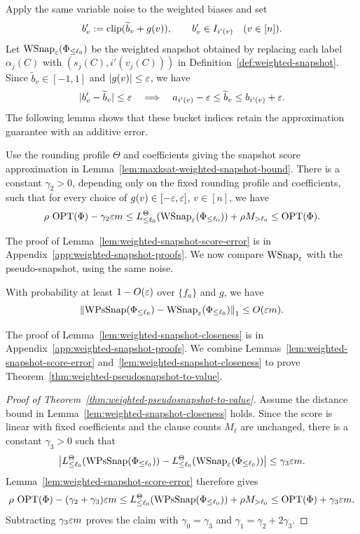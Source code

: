 \medskip
Apply the same variable noise to the weighted biases and set
\[
  b'_v:=\operatorname{clip}(\widetilde b_v+g(v)),\qquad
  b'_v\in I_{i'(v)}\quad(v\in[n]).
\]
Let $\operatorname{WSnap}_{\varepsilon}(\Phi_{\le\ell_0})$ be the weighted snapshot obtained by replacing each label $\alpha_j(C)$ with $(s_j(C),i'(v_j(C)))$ in Definition~\ref{def:weighted-snapshot}.
Since $\widetilde b_v\in[-1,1]$ and $|g(v)|\le\varepsilon$, we have
\[
  |b'_v-\widetilde b_v|\le\varepsilon
  \quad\Longrightarrow\quad
  a_{i'(v)}-\varepsilon\le\widetilde b_v\le b_{i'(v)}+\varepsilon.
\]
The following lemma shows that these bucket indices retain the approximation guarantee with an additive error.
\begin{samepage}
\begin{lemma}
\label{lem:weighted-snapshot-score-error}
Use the rounding profile $\Theta$ and coefficients giving the snapshot score approximation in Lemma~\ref{lem:maxksat-weighted-snapshot-bound}.
There is a constant $\gamma_2>0$, depending only on the fixed rounding profile and coefficients, such that for every choice of $g(v)\in[-\varepsilon,\varepsilon]$, $v\in[n]$, we have
\[
  \rho\,\operatorname{OPT}(\Phi)-\gamma_2\varepsilon m
  \le L_{\le\ell_0}^\Theta(\operatorname{WSnap}_{\varepsilon}(\Phi_{\le\ell_0}))
     +\rho M_{>\ell_0}
  \le\operatorname{OPT}(\Phi).
\]
\end{lemma}
\end{samepage}
The proof of Lemma~\ref{lem:weighted-snapshot-score-error} is in Appendix~\ref{app:weighted-snapshot-proofs}.
We now compare $\operatorname{WSnap}_{\varepsilon}$ with the pseudo-snapshot, using the same noise.
\begin{lemma}
\label{lem:weighted-snapshot-closeness}
With probability at least $1-O(\varepsilon)$ over $\{f_a\}$ and $g$, we have
\[
  \left\lVert \operatorname{WPsSnap}(\Phi_{\le\ell_0})-\operatorname{WSnap}_{\varepsilon}(\Phi_{\le\ell_0}) \right\rVert_1
  \le O(\varepsilon m).
\]
\end{lemma}
The proof of Lemma~\ref{lem:weighted-snapshot-closeness} is in Appendix~\ref{app:weighted-snapshot-proofs}. We combine Lemmas~\ref{lem:weighted-snapshot-score-error} and~\ref{lem:weighted-snapshot-closeness} to prove Theorem~\ref{thm:weighted-pseudosnapshot-to-value}.

\begin{samepage}
\begin{proof}[Proof of Theorem~\ref{thm:weighted-pseudosnapshot-to-value}]
Assume the distance bound in Lemma~\ref{lem:weighted-snapshot-closeness} holds.
Since the score is linear with fixed coefficients and the clause counts $M_\ell$ are unchanged, there is a constant $\gamma_3>0$ such that
\begin{equation}
  \left|L_{\le\ell_0}^\Theta(\operatorname{WPsSnap}(\Phi_{\le\ell_0}))
       -L_{\le\ell_0}^\Theta(\operatorname{WSnap}_{\varepsilon}(\Phi_{\le\ell_0}))\right|
  \le\gamma_3\varepsilon m.
  \label{eq:weighted-pseudosnapshot-score-distance}
\end{equation}
Lemma~\ref{lem:weighted-snapshot-score-error} therefore gives
\[
  \rho\,\operatorname{OPT}(\Phi)-(\gamma_2+\gamma_3)\varepsilon m
  \le L_{\le\ell_0}^\Theta(\operatorname{WPsSnap}(\Phi_{\le\ell_0}))+\rho M_{>\ell_0}
  \le\operatorname{OPT}(\Phi)+\gamma_3\varepsilon m.
\]
Subtracting $\gamma_3\varepsilon m$ proves the claim with $\gamma_0=\gamma_3$ and $\gamma_1=\gamma_2+2\gamma_3$.
\end{proof}
\end{samepage}
